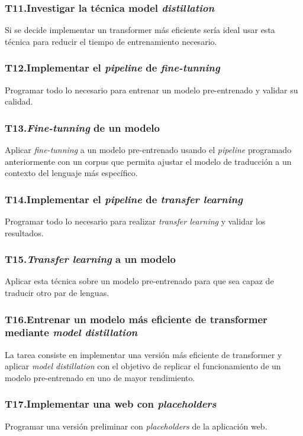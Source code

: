 \subsubsection{T11.\quad Investigar la técnica model \textit{distillation}}\label{T11}
Si se decide implementar un transformer más eficiente sería ideal usar esta técnica para
reducir el tiempo de entrenamiento necesario.
\subsubsection{T12.\quad Implementar el \textit{pipeline} de \textit{fine-tunning}}\label{T12}
Programar todo lo necesario para entrenar un modelo pre-entrenado y validar su calidad.
\subsubsection{T13.\quad \textit{Fine-tunning} de un modelo}\label{T13}
Aplicar \textit{fine-tunning} a un modelo pre-entrenado usando el \textit{pipeline} programado
anteriormente con un corpus que permita ajustar el modelo de traducción a un contexto del lenguaje
más específico.
\subsubsection{T14.\quad Implementar el \textit{pipeline} de \textit{transfer learning}}\label{T14}
Programar todo lo necesario para realizar \textit{transfer learning} y validar los resultados.
\subsubsection{T15.\quad \textit{Transfer learning} a un modelo}\label{T15}
Aplicar esta técnica sobre un modelo pre-entrenado para que sea capaz de traducir otro
par de lenguas.
\subsubsection{T16.\quad Entrenar un modelo más eficiente de transformer mediante \textit{model distillation}}\label{T16}
La tarea consiste en implementar una versión más eficiente de transformer y aplicar
\textit{model distillation} con el objetivo de replicar el funcionamiento de un modelo pre-entrenado
en uno de mayor rendimiento.
\subsubsection{T17.\quad Implementar una web con \textit{placeholders}}\label{T17}
Programar una versión preliminar con \textit{placeholders} de la aplicación web.
